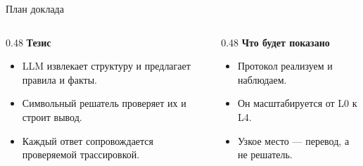 \documentclass[aspectratio=169,11pt]{beamer}
\begin{document}
\begin{frame}{План доклада}
  \centering

  \vspace{8mm}
  \begin{columns}[T,onlytextwidth]
    \begin{column}{0.48\textwidth}
      \textbf{Тезис}
      \begin{itemize}
        \item LLM извлекает структуру и предлагает правила и факты.
        \item Символьный решатель проверяет их и строит вывод.
        \item Каждый ответ сопровождается проверяемой трассировкой.
      \end{itemize}
    \end{column}
    \begin{column}{0.48\textwidth}
      \textbf{Что будет показано}
      \begin{itemize}
        \item Протокол реализуем и наблюдаем.
        \item Он масштабируется от L0 к L4.
        \item Узкое место --- перевод, а не решатель.
      \end{itemize}
    \end{column}
  \end{columns}
\end{frame}

\end{document}
